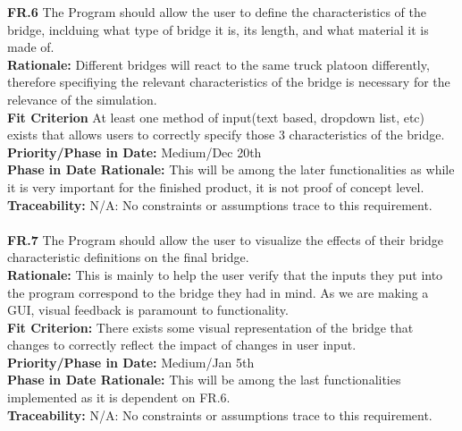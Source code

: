 \documentclass[12pt]{article}
\begin{document}
  \noindent\textbf{FR.6} The Program should allow the user to define the characteristics of the bridge, inclduing what type of bridge it is, its length, and what material it
  is made of.\\
  \textbf{Rationale:} Different bridges will react to the same truck platoon differently, therefore specifiying the relevant characteristics of the bridge is necessary for
  the relevance of the simulation.\\
  \textbf{Fit Criterion} At least one method of input(text based, dropdown list, etc) exists that allows users to correctly specify those 3 characteristics of the bridge.\\
  \textbf{Priority/Phase in Date:} Medium/Dec 20th\\
  \textbf{Phase in Date Rationale:} This will be among the later functionalities as while it is very important for the finished product, it is not proof of concept level.\\
  \textbf{Traceability:} N/A: No constraints or assumptions trace to this requirement.\\\\
  
  \noindent\textbf{FR.7} The Program should allow the user to visualize the effects of their bridge characteristic definitions on the final bridge.\\
  \textbf{Rationale:} This is mainly to help the user verify that the inputs they put into the program correspond to the bridge they had in mind. As we are making a GUI,
  visual feedback is paramount to functionality.\\
  \textbf{Fit Criterion:} There exists some visual representation of the bridge that changes to correctly reflect the impact of changes in user input.\\
  \textbf{Priority/Phase in Date:} Medium/Jan 5th\\
  \textbf{Phase in Date Rationale:} This will be among the last functionalities implemented as it is dependent on FR.6.\\
  \textbf{Traceability:} N/A: No constraints or assumptions trace to this requirement.\\\\
  
\end{document}
